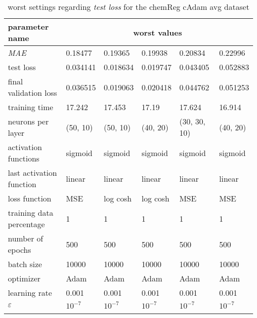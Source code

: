 \begin{longtable}{|l|l|l|l|l|>{\columncolor{worstColumnColor}}l|}
\hline
\textbf{parameter name} & \multicolumn{5}{c|}{\textbf{worst values}} \\
\hline
\textit{MAE}             & 0.18477 & 0.19365 & 0.19938 & 0.20834 & 0.22996 \\
test loss                & 0.034141 & 0.018634 & 0.019747 & 0.043405 & 0.052883 \\
final validation loss    & 0.036515 & 0.019063 & 0.020418 & 0.044762 & 0.051253 \\
training time            & 17.242  & 17.453  & 17.19   & 17.624  & 16.914  \\
neurons per layer        & (50, 10) & (50, 10) & (40, 20) & (30, 30, 10) & (40, 20) \\
{\color{equalParamColor} activation functions } & {\color{equalParamColor} sigmoid } & {\color{equalParamColor} sigmoid } & {\color{equalParamColor} sigmoid } & {\color{equalParamColor} sigmoid } & {\color{equalParamColor} sigmoid } \\
{\color{equalParamColor} last activation function } & {\color{equalParamColor} linear } & {\color{equalParamColor} linear } & {\color{equalParamColor} linear } & {\color{equalParamColor} linear } & {\color{equalParamColor} linear } \\
loss function            & MSE     & log cosh & log cosh & MSE     & MSE     \\
{\color{equalParamColor} training data percentage } & {\color{equalParamColor} 1 } & {\color{equalParamColor} 1 } & {\color{equalParamColor} 1 } & {\color{equalParamColor} 1 } & {\color{equalParamColor} 1 } \\
{\color{equalParamColor} number of epochs } & {\color{equalParamColor} 500 } & {\color{equalParamColor} 500 } & {\color{equalParamColor} 500 } & {\color{equalParamColor} 500 } & {\color{equalParamColor} 500 } \\
{\color{equalParamColor} batch size } & {\color{equalParamColor} 10000 } & {\color{equalParamColor} 10000 } & {\color{equalParamColor} 10000 } & {\color{equalParamColor} 10000 } & {\color{equalParamColor} 10000 } \\
{\color{equalParamColor} optimizer } & {\color{equalParamColor} Adam } & {\color{equalParamColor} Adam } & {\color{equalParamColor} Adam } & {\color{equalParamColor} Adam } & {\color{equalParamColor} Adam } \\
{\color{equalParamColor} learning rate } & {\color{equalParamColor} 0.001 } & {\color{equalParamColor} 0.001 } & {\color{equalParamColor} 0.001 } & {\color{equalParamColor} 0.001 } & {\color{equalParamColor} 0.001 } \\
{\color{equalParamColor} $\varepsilon$ } & {\color{equalParamColor} $10^{-7}$ } & {\color{equalParamColor} $10^{-7}$ } & {\color{equalParamColor} $10^{-7}$ } & {\color{equalParamColor} $10^{-7}$ } & {\color{equalParamColor} $10^{-7}$ } \\
\hline

\caption{worst settings regarding \textit{test loss} for the chemReg cAdam avg dataset}
\label{table:test_loss_worst_chemreg_cadam_avg}
\end{longtable}

